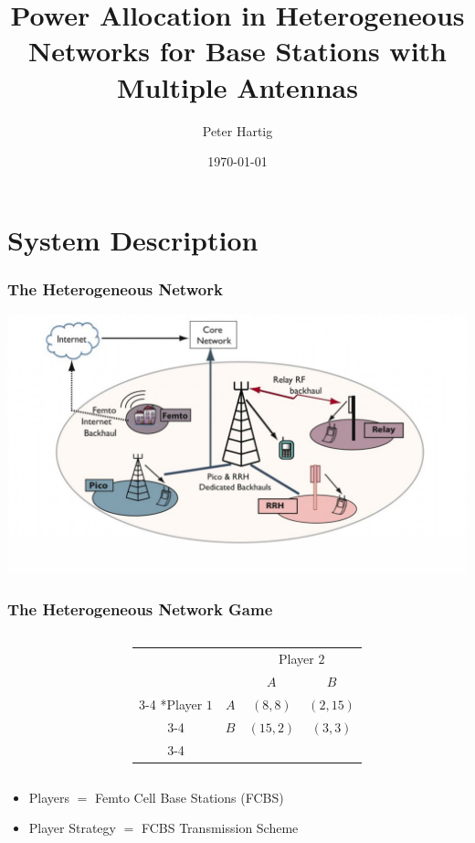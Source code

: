 \documentclass[10pt,tgadventor, onlymath]{beamer}
\title{\large \bfseries Power Allocation in Heterogeneous Networks for Base Stations with Multiple Antennas}
\author{Peter Hartig\\[3ex]
}
\date{\today}
\begin{document}
\frame{
\thispagestyle{empty}
\titlepage
}

\section{System Description}
\begin{frame}
\frametitle{The Heterogeneous Network}
	\includegraphics[width=\textwidth]{het_net}
\end{frame}


\begin{frame}
\frametitle{The Heterogeneous Network Game}
\begin{columns}

\begin{column}{0.5\linewidth}
	

\end{column}
\begin{column}{0.5\linewidth}
\begin{table}
    \setlength{\extrarowheight}{2pt}
    \begin{tabular}{cc|c|c|}
      & \multicolumn{1}{c}{} & \multicolumn{2}{c}{Player $2$}\\
      & \multicolumn{1}{c}{} & \multicolumn{1}{c}{$A$}  & \multicolumn{1}{c}{$B$} \\\cline{3-4}
      \multirow{2}*{Player $1$}  & $A$ & $(8,8)$ & $(2,15)$ \\\cline{3-4}
      & $B$ & $(15,2)$ & $(3,3)$ \\\cline{3-4}
    \end{tabular}
  \end{table}
\end{column}
\end{columns}
\bigskip
\begin{itemize}
\item 
	Players $=$ Femto Cell Base Stations (FCBS)
\item 
	Player Strategy $=$ FCBS Transmission Scheme
\end{itemize}

\end{frame}
\end{document}
